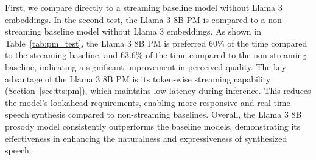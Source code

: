 First, we compare directly to a streaming baseline model without Llama 3 embeddings. 
In  the second test, the Llama 3 8B PM is compared to a non-streaming baseline model without Llama 3 embeddings. 
As shown in Table~\ref{tab:pm_test}, the Llama 3 8B PM is preferred  60\% of the time compared to the streaming baseline, and 63.6\% of the time  compared to the non-streaming baseline, indicating a significant improvement in perceived quality. The key advantage of the Llama 3 8B PM is its token-wise streaming capability (Section~\ref{sec:tts:pm}), which maintains low latency during inference. This reduces the model's lookahead requirements, enabling more responsive and real-time speech synthesis compared to non-streaming baselines.
Overall, the Llama 3 8B prosody model consistently outperforms the baseline models, demonstrating its effectiveness in enhancing the naturalness and expressiveness of synthesized speech.
